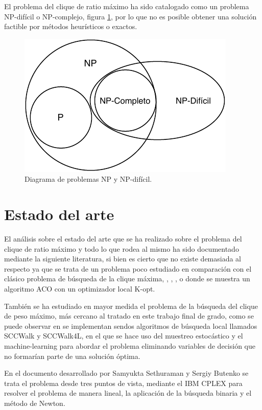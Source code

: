 El problema del clique de ratio máximo ha sido catalogado como un problema NP-difícil o NP-complejo, figura \ref{fig:np-dificil}, por lo que no es posible obtener una solución factible por métodos heurísticos o exactos.

\begin{figure}[H]
	\centering
	\includegraphics{Figures/problemas-np-hard.pdf}
	\caption{Diagrama de problemas NP y NP-difícil.}
	\label{fig:np-dificil}
\end{figure}

\section{Estado del arte}
El análisis sobre el estado del arte que se ha realizado sobre el problema del clique de ratio máximo y todo lo que rodea al mismo ha sido documentado mediante la siguiente literatura, si bien es cierto que no existe demasiada al respecto ya que se trata de un problema poco estudiado en comparación con el clásico problema de búsqueda de la clique máxima, \cite{mcp-batsyn}, \cite{mcp-ryp}, \cite{mcp-neuro}, o \cite{mcp-ants} donde se muestra un algoritmo \gls{ACO} con un optimizador local K-opt.

También se ha estudiado en mayor medida el problema de la búsqueda del clique de peso máximo, más cercano al tratado en este trabajo final de grado, como se puede observar en \cite{mwcp-ls} se implementan sendos algoritmos de búsqueda local llamados SCCWalk y SCCWalk4L, \cite{mwcp-ml} en el que se hace uso del muestreo estocástico y el machine-learning para abordar el problema eliminando variables de decisión que no formarían parte de una solución óptima.

En el documento desarrollado por Samyukta Sethuraman  y Sergiy Butenko \cite{mrcp-Sethuraman:2015} se trata el problema desde tres puntos de vista, mediante el IBM CPLEX para resolver el problema de manera lineal, la aplicación de la búsqueda binaria y el método de Newton.

